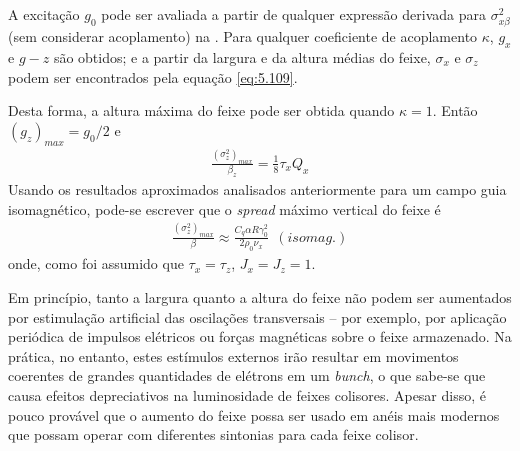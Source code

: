 A excitação $g_0$ pode ser avaliada a partir de qualquer expressão derivada para $\sigma_{x\beta}^2$ (sem considerar acoplamento) na . Para qualquer coeficiente de acoplamento $\kappa$, $g_x$ e $g-z$ são obtidos; e a partir da largura e da altura médias do feixe, $\sigma_x$ e $\sigma_z$ podem ser encontrados pela equação \eqref{eq:5.109}.

Desta forma, a altura máxima do feixe pode ser obtida quando $\kappa=1$. Então $(g_z)_{max} = g_0/2$ e
\begin{align}
	\frac{(\sigma_z^2)_{max}}{\beta_z} = \frac{1}{8} \tau_x Q_x
\end{align}
Usando os resultados aproximados analisados anteriormente para um campo guia isomagnético, pode-se escrever que o \textit{spread} máximo vertical do feixe é
\begin{align}
	\frac{(\sigma_z^2)_{max}}{\beta} \approx \frac{C_q \alpha R \gamma_0^2}{2 \rho_0 \nu_x}\ \ (isomag.)
\end{align}
onde, como foi assumido que $\tau_x = \tau_z$, $J_x = J_z = 1$.

Em princípio, tanto a largura quanto a altura do feixe não podem ser aumentados por estimulação artificial das oscilações transversais -- por exemplo, por aplicação periódica de impulsos elétricos ou forças magnéticas sobre o feixe armazenado. Na prática, no entanto, estes estímulos externos irão resultar em movimentos coerentes de grandes quantidades de elétrons em um \textit{bunch}, o que sabe-se que causa efeitos depreciativos na luminosidade de feixes colisores. Apesar disso, é pouco provável que o aumento do feixe possa ser usado em anéis mais modernos que possam operar com diferentes sintonias para cada feixe colisor.